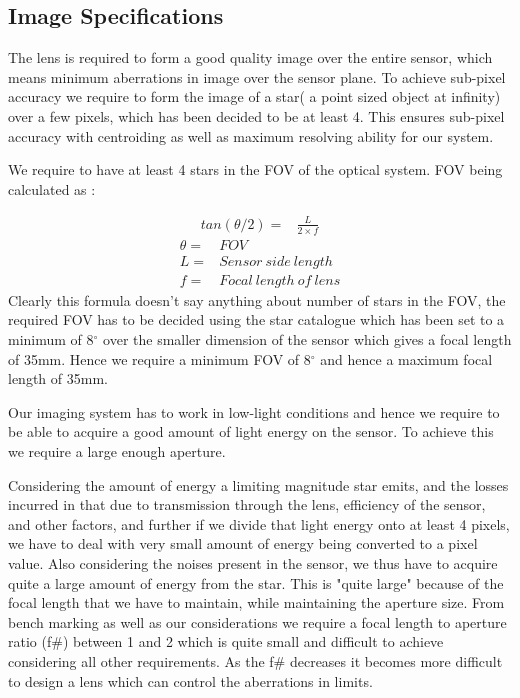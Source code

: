 \subsection{Image Specifications}
The lens is required to form a good quality image over the entire sensor, which means minimum aberrations in image over the sensor plane. To achieve sub-pixel accuracy we require to form the image of a star( a point sized object at infinity) over a few pixels, which has been decided to be at least 4. This ensures sub-pixel accuracy with centroiding as well as maximum resolving ability for our system.

We require to have at least 4 stars in the FOV of the optical system. FOV being calculated as :

\begin{align}
    tan(\theta/2)=&\frac{L}{2\times f}
\end{align}
\begin{align*}
    \theta=&FOV
    \\L=&Sensor\:side\:length
    \\f=&Focal\:length\:of\:lens 
\end{align*}
Clearly this formula doesn't say anything about number of stars in the FOV, the required FOV has to be decided using the star catalogue which has been set to a minimum of 8$^{\circ}$ over the smaller dimension of the sensor which gives a focal length of 35mm. Hence we require a minimum FOV of 8$^{\circ}$ and hence a maximum focal length of 35mm.

Our imaging system has to work in low-light conditions and hence we require to be able to acquire a good amount of light energy on the sensor. To achieve this we require a large enough aperture.

Considering the amount of energy a limiting magnitude star emits, and the losses incurred in that due to transmission through the lens, efficiency of the sensor, and other factors, and further if we divide that light energy onto at least 4 pixels, we have to deal with very small amount of energy being converted to a pixel value. Also considering the noises present in the sensor, we thus have to acquire quite a large amount of energy from the star.
This is "quite large" because of the focal length that we have to maintain, while maintaining the aperture size. From bench marking as well as our considerations we require a focal length to aperture ratio (f\#) between 1 and 2 which is quite small and difficult to achieve considering all other requirements. As the f\# decreases it becomes more difficult to design a lens which can control the aberrations in limits.

